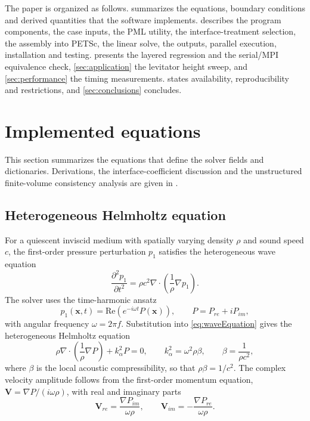 \documentclass[final,12pt,nopreprintline]{elsarticle}
\newcounter{bla}
\begin{document}
The paper is organized as follows.   summarizes the equations,
boundary conditions and derived quantities that the software implements.
 describes the program components, the case inputs, the
PML utility, the interface-treatment selection, the assembly into PETSc, the
linear solve, the outputs, parallel execution, installation and testing.
 presents the layered regression and the serial/MPI
equivalence check, \cref{sec:application} the levitator height sweep, and
\cref{sec:performance} the timing measurements.  
states availability, reproducibility and restrictions, and
\cref{sec:conclusions} concludes.

\section{Implemented equations}
\label{sec:model}

This section summarizes the equations that define the solver fields and
dictionaries.  Derivations, the interface-coefficient discussion and the
unstructured finite-volume consistency analysis are given in
\cite{Xu2026HelmholtzPML}.

\subsection{Heterogeneous Helmholtz equation}
\label{sec:helmholtz}

For a quiescent inviscid medium with spatially varying density $\rho$ and
sound speed $c$, the first-order pressure perturbation $p_1$ satisfies the
heterogeneous wave equation
\begin{equation}
    \frac{\partial^2 p_1}{\partial t^2}
    =
    \rho c^2\nabla\cdot\left(\frac{1}{\rho}\nabla p_1\right).
    \label{eq:waveEquation}
\end{equation}
The solver uses the time-harmonic ansatz
\begin{equation}
    p_1(\mathbf{x},t)=\mathrm{Re}\left(e^{-i\omega t}P(\mathbf{x})\right),
    \qquad
    P=P_{re}+iP_{im},
    \label{eq:harmonicAnsatz}
\end{equation}
with angular frequency $\omega=2\pi f$.  Substitution into
\cref{eq:waveEquation} gives the heterogeneous Helmholtz equation
\begin{equation}
    \rho\nabla\cdot\left(\frac{1}{\rho}\nabla P\right)
    + k_\alpha^2 P = 0,
    \qquad
    k_\alpha^2 = \omega^2\rho\beta,
    \qquad
    \beta=\frac{1}{\rho c^2},
    \label{eq:helmholtz}
\end{equation}
where $\beta$ is the local acoustic compressibility, so that $\rho\beta=1/c^2$.
The complex velocity amplitude follows from the first-order momentum equation,
$\mathbf{V}=\nabla P/(i\omega\rho)$, with real and imaginary parts
\begin{equation}
    \mathbf{V}_{re}=\frac{\nabla P_{im}}{\omega\rho},
    \qquad
    \mathbf{V}_{im}=-\frac{\nabla P_{re}}{\omega\rho}.
    \label{eq:complexVelocity}
\end{equation}
\end{document}
